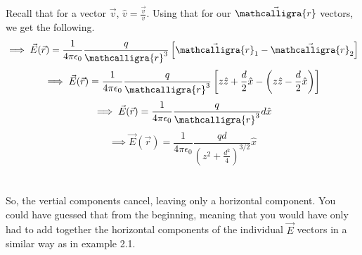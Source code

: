 \documentclass[12pt]{article}
\newcommand{\ds}{\displaystyle}
\newcommand{\scripty}[1]{\ensuremath{\mathcalligra{#1}}}
\begin{document}
\begin{flushleft}
Recall that for a vector $\vec{v}$, $\ds\hat{v}=\frac{\vec{v}}{v}$.
Using that for our $\vec{\scripty{r}}$ vectors, we get the following.
$$\implies\vec{E}(\vec{r})=\frac{1}{4\pi\epsilon_0}\frac{q}{\scripty{r}^3}\left[\vec{\scripty{r}}_1-\vec{\scripty{r}}_2\right]$$
$$\implies\vec{E}(\vec{r})=\frac{1}{4\pi\epsilon_0}\frac{q}{\scripty{r}^3}\left[z\hat{z}+\frac{d}{2}\hat{x}-\left(z\hat{z}-\frac{d}{2}\hat{x}\right)\right]$$
$$\implies\vec{E}(\vec{r})=\frac{1}{4\pi\epsilon_0}\frac{q}{\scripty{r}^3}d\hat{x}$$
$$\implies\vec{E}(\vec{r})=\frac{1}{4\pi\epsilon_0}\frac{qd}{\left(z^2+\frac{d^2}{4}\right)^{3/2}}\hat{x}$$\\~\\

So, the vertial components cancel, leaving only a horizontal component.
You could have guessed that from the beginning, meaning that you would have only had to add together the horizontal components of the individual $\vec{E}$ vectors in a similar way as in example 2.1.




\end{flushleft}
\end{document}
